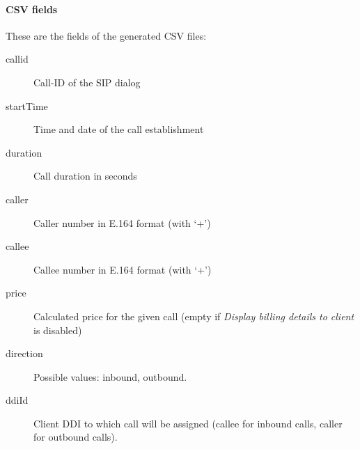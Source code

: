 \documentclass[letterpaper,10pt,english]{sphinxmanual}
\begin{document}
\paragraph{CSV fields}
\label{administration_portal/client/residential/calls/call_csv_schedulers:csv-fields}
These are the fields of the generated CSV files:
\begin{description}
\item[{callid}] \leavevmode{}\label{administration_portal/client/residential/calls/call_csv_schedulers:term-callid}
Call-ID of the SIP dialog

\item[{startTime}] \leavevmode{}\label{administration_portal/client/residential/calls/call_csv_schedulers:term-starttime}
Time and date of the call establishment

\item[{duration}] \leavevmode{}\label{administration_portal/client/residential/calls/call_csv_schedulers:term-duration}
Call duration in seconds

\item[{caller}] \leavevmode{}\label{administration_portal/client/residential/calls/call_csv_schedulers:term-caller}
Caller number in E.164 format (with `+')

\item[{callee}] \leavevmode{}\label{administration_portal/client/residential/calls/call_csv_schedulers:term-callee}
Callee number in E.164 format (with `+')

\item[{price}] \leavevmode{}\label{administration_portal/client/residential/calls/call_csv_schedulers:term-price}
Calculated price for the given call (empty if \emph{Display billing details to client} is disabled)

\item[{direction}] \leavevmode{}\label{administration_portal/client/residential/calls/call_csv_schedulers:term-16}
Possible values: inbound, outbound.

\item[{ddiId}] \leavevmode{}\label{administration_portal/client/residential/calls/call_csv_schedulers:term-ddiid}
Client DDI to which call will be assigned (callee for inbound calls, caller for outbound calls).


\end{description}
\end{document}
